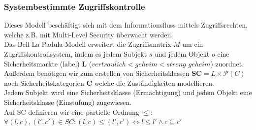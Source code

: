 \documentclass[a4paper,12pt,leqno]{article}
\begin{document}
\subsubsection{Systembestimmte Zugriffskontrolle}
Dieses Modell beschäftigt sich mit dem Informationsfluss mittels Zugriffsrechten, welche z.B. mit Multi-Level Security überwacht werden.\\

Das Bell-La Padula Modell erweitert die Zugriffsmatrix $M$ um ein Zugriffskontrollsystem, indem es jedem Subjekt $s$ und jedem Objekt $o$ eine Sicherheitsmarkte (label) \textbf{L}  ($vertraulich<geheim<streng$ $geheim$) zuordnet.\\
Außerdem benötigen wir zum erstellen von Sicherheitsklassen \textbf{SC}$=L\times \mathcal{P}(C)$ noch Sicherheitskategorien \textbf{C} welche die Zuständigkeiten modellieren.\\
Jedem Subjekt wird eine Sicherheitsklasse (Ermächtigung) und jedem Objekt eine Sicherheitsklasse (Einstufung) zugewiesen.\\
Auf SC definieren wir eine partielle Ordnung $\leq$:\\ 
$\forall (l,c),(l',c')\in SC:(l,c)\leq (l',c')\Leftrightarrow l\leq l'\wedge c\subseteq c'$\\
\end{document}
